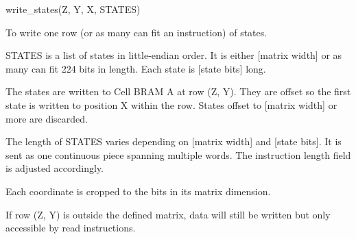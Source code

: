 

\format
write\_states(Z, Y, X, STATES)

\purpose

To write one row (or as many can fit an instruction) of states.

\description

STATES is a list of states in little-endian order.
It is either [matrix width] or as many can fit 224 bits in length.
Each state is [state bits] long.

The states are written to Cell BRAM A at row (Z, Y).
They are offset so the first state is written to position X within the row.
States offset to [matrix width] or more are discarded.

The length of STATES varies depending on [matrix width] and [state bits].
It is sent as one continuous piece spanning multiple words.
The instruction length field is adjusted accordingly.

\notes

Each coordinate is cropped to the bits in its matrix dimension.

If row (Z, Y) is outside the defined matrix, data will still be written but only accessible by read instructions.
